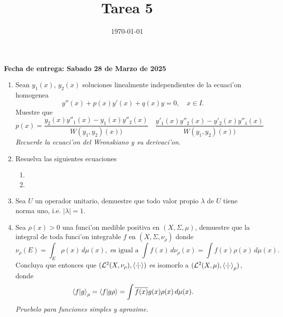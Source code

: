 \documentclass[letterpaper]{article}
\date{\today}
\title{Tarea 5}
\newcommand{\sig}{\ensuremath{\Sigma}}
\begin{document}
\maketitle

\textbf{Fecha de entrega: Sabado 28 de Marzo de 2025}

\begin{enumerate}
  \item Sean $y_{1}(x)$, $y_{2}(x)$ soluciones linealmente independientes de la ecuaci'on homogenea
        \[
            y''(x)+p(x)y'(x)+q(x)y=0,\quad x\in I.
        \]
        Muestre que
        \[
        p(x)=\frac{y_{2}(x)y''_{1}(x)-y_{1}(x)y''_{2}(x)}{W(y_{1},y_{2})(x))}\quad\frac{y'_{1}(x)y''_{2}(x)-y'_{2}(x)y''_{1}(x)}{W(y_{1},y_{2})(x))}
        \]
\noindent\emph{Recuerde la ecuaci'on del Wronskiano y su derivaci'on.}
  \item Resuelva las siguientes ecuaciones
        \begin{enumerate}
          \item
          \item
        \end{enumerate}

  \item Sea \(U\) un operador unitario, demuestre que todo valor propio $\lambda$ de \(U\) tiene norma uno, i.e. $|\lambda|=1$.
  \item Sea $\rho(x)>0$ una funci'on medible positiva en $(X,\sig,\mu)$, demuestre que la integral de toda funci'on integrable $f$ en $(X,\sig,\nu_{\rho})$ donde
        \[
        \nu_{\rho}(E)=\int_{E}\rho(x)\,d\mu(x),\text{ es igual a }\int f(x)\,d\nu_{\rho}(x)=\int f(x)\rho(x)\,d\mu(x).
        \]
        Concluya que entonces que \((\mathcal{L}^{2}(X,\nu_{\rho}),\braket{\cdot|\cdot})\) es isomorfo a \((\mathcal{L}^{2}(X,\mu),\braket{\cdot|\cdot}_{\rho})\), donde
        \[
        \braket{f|g}_{\rho}=\braket{f|g\rho}=\int\overline{f(x)}g(x)\rho(x)\,d\mu(x).
        \]
\noindent\emph{Pruebelo para funciones simples y aproxime.}
\end{enumerate}
\end{document}
